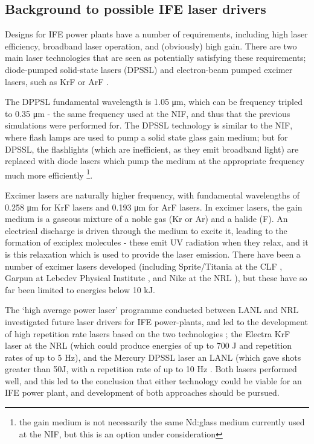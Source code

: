 \subsection{Background to possible IFE laser drivers}

Designs for IFE power plants have a number of requirements, including high laser efficiency, broadband laser operation, and (obviously) high gain. There are two main laser technologies that are seen as potentially satisfying these requirements; diode-pumped solid-state lasers (DPSSL) and electron-beam pumped excimer lasers, such as KrF or ArF \cite{Craxton2015}. 

The DPPSL fundamental wavelength is 1.05 \unit{\micro\meter}, which can be frequency tripled to 0.35 \unit{\micro\meter} - the same frequency used at the NIF, and thus that the previous simulations were performed for. The DPSSL technology is similar to the NIF, where flash lamps are used to pump a solid state glass gain medium; but for DPSSL, the flashlights (which are inefficient, as they emit broadband light) are replaced with diode lasers which pump the medium at the appropriate frequency much more efficiently \footnote{the gain medium is not necessarily the same Nd:glass medium currently used at the NIF, but this is an option under consideration}. 

Excimer lasers are naturally higher frequency, with fundamental wavelengths of 0.258 \unit{\micro\meter} for KrF lasers and 0.193 \unit{\micro\meter} for ArF lasers. In excimer lasers, the gain medium is a gaseous mixture of a noble gas (Kr or Ar) and a halide (F). An electrical discharge is driven through the medium to excite it, leading to the formation of exciplex molecules - these emit UV radiation when they relax, and it is this relaxation which is used to provide the laser emission. There have been a number of excimer lasers developed (including Sprite/Titania at the CLF \cite{Divall1996}, Garpun at Lebedev Physical Institute \cite{Zvorykin2006}, and Nike at the NRL \cite{Obenschain1996}), but these have so far been limited to energies below 10 kJ. 

The `high average power laser' programme conducted between LANL and NRL investigated future laser drivers for IFE power-plants, and led to the development of high repetition rate lasers based on the two technologies \cite{Craxton2015}; the Electra KrF laser at the NRL (which could produce energies of up to 700 J and repetition rates of up to 5 Hz), and the Mercury DPSSL laser an LANL (which gave shots greater than 50J, with a repetition rate of up to 10 Hz \cite{Sethian2010}. Both lasers performed well, and this led to the conclusion that either technology could be viable for an IFE power plant, and development of both approaches should be pursued.

